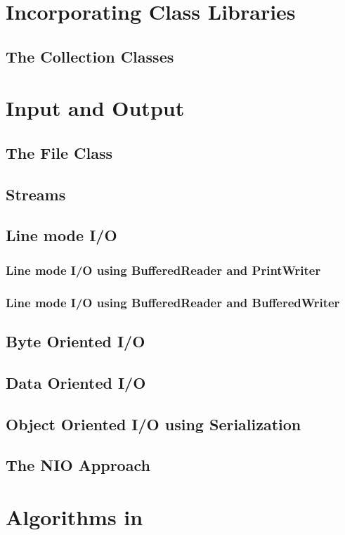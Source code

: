 {\chapter{Incorporating Class Libraries}
\section{The Collection Classes}

\chapter{Input and Output}
\section{The File Class}
\section{Streams}
\section{Line mode I/O}
\subsection{Line mode I/O using BufferedReader and PrintWriter}
\subsection{Line mode I/O using BufferedReader and BufferedWriter}
\section{Byte Oriented I/O}
\section{Data Oriented I/O}
\section{Object Oriented I/O using Serialization}
\section{The NIO Approach}
\chapter{Algorithms in \nr}{}
}

